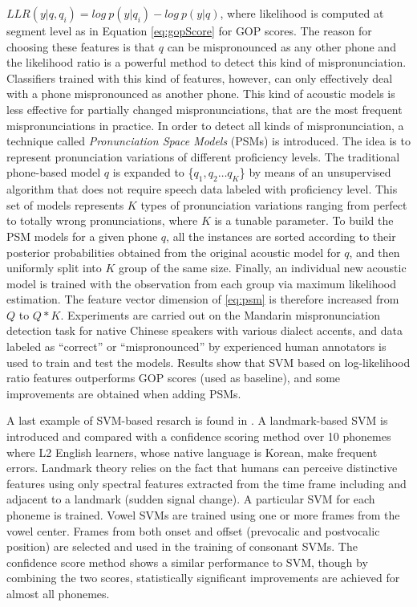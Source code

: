 $LLR(y|q,q_{i})=log \ p(y|q_{i}) - log \ p(y|q)$, where likelihood is computed at segment
level as in Equation \ref{eq:gopScore} for GOP scores. The reason for choosing these features is
that $q$ can be mispronounced as any other phone and the likelihood ratio is a powerful
method to detect this kind of mispronunciation. Classifiers trained with this kind of features, however,
can only effectively deal with a phone mispronounced as another phone. This kind of acoustic models is
less effective for partially changed mispronunciations, that are the most frequent mispronunciations
in practice. In order to detect all kinds of mispronunciation, a technique called
\textit{Pronunciation Space Models} (PSMs) is introduced. The idea is to represent pronunciation variations
of different proficiency levels. The traditional phone-based model $q$ is expanded to
\{$q_{1}, q_{2} \dotsc q_{K}$\} by means of an unsupervised algorithm that does not require
speech data labeled with proficiency level.
This set of models represents $K$ types of pronunciation variations ranging from perfect to
totally wrong pronunciations, where $K$ is a tunable parameter. To build the PSM models for a
given phone $q$, all the instances are sorted according to their
posterior probabilities obtained from the original acoustic model for $q$, and
then uniformly split into $K$ group of the same size. Finally, an individual new acoustic
model is trained with the observation from each group via maximum likelihood estimation.
The feature vector dimension of \ref{eq:psm} is therefore increased from $Q$ to $Q*K$.
Experiments are carried out on the
Mandarin mispronunciation detection task for native Chinese speakers with various dialect accents,
and data labeled as ``correct'' or ``mispronounced'' by experienced human annotators is used to train and test the models.
Results show that SVM based on log-likelihood ratio features outperforms GOP scores (used as baseline), and some
improvements are obtained when adding PSMs.

A last example of SVM-based resarch is found in \cite{landmark_svm, landmark_svm_2}.
A landmark-based SVM is introduced and compared with a confidence
scoring method over 10 phonemes where
L2 English learners, whose native language is Korean, make frequent errors.
Landmark theory relies on the fact that humans can perceive distinctive
features using only spectral features extracted from the time frame including and adjacent to
a landmark (sudden signal change). A particular SVM for each phoneme is trained. Vowel SVMs are
trained using one or more frames from the vowel center. Frames from both onset and offset
(prevocalic and postvocalic position) are selected and used in the training of consonant
SVMs. The confidence score method shows a similar performance to SVM, though by combining
the two scores, statistically significant improvements are achieved for almost all phonemes.

